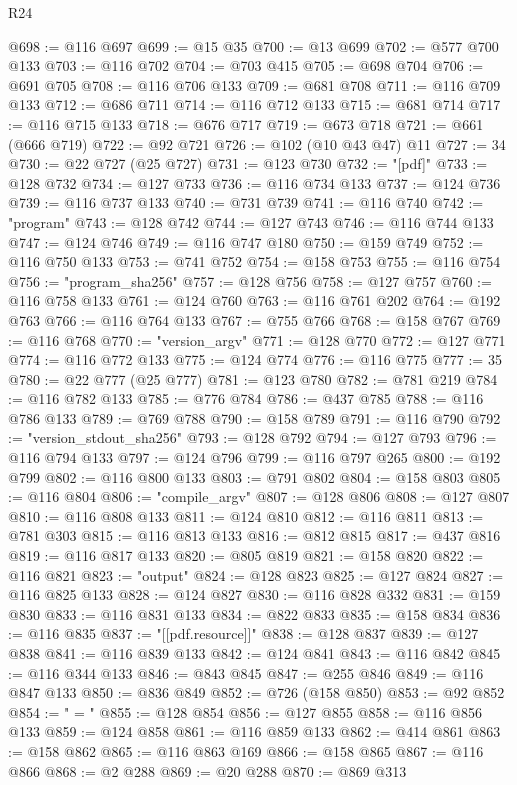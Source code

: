 \begin{lexlean}{R24}
\begin{coremodule}
@698 := @116 @697
@699 := @15 @35
@700 := @13 @699
@702 := @577 @700 @133
@703 := @116 @702
@704 := @703 @415
@705 := @698 @704
@706 := @691 @705
@708 := @116 @706 @133
@709 := @681 @708
@711 := @116 @709 @133
@712 := @686 @711
@714 := @116 @712 @133
@715 := @681 @714
@717 := @116 @715 @133
@718 := @676 @717
@719 := @673 @718
@721 := @661 (@666 @719)
@722 := @92 @721
@726 := @102 (@10 @43 @47) @11
@727 := 34
@730 := @22 @727 (@25 @727)
@731 := @123 @730
@732 := "[pdf]"
@733 := @128 @732
@734 := @127 @733
@736 := @116 @734 @133
@737 := @124 @736
@739 := @116 @737 @133
@740 := @731 @739
@741 := @116 @740
@742 := "program"
@743 := @128 @742
@744 := @127 @743
@746 := @116 @744 @133
@747 := @124 @746
@749 := @116 @747 @180
@750 := @159 @749
@752 := @116 @750 @133
@753 := @741 @752
@754 := @158 @753
@755 := @116 @754
@756 := "program_sha256"
@757 := @128 @756
@758 := @127 @757
@760 := @116 @758 @133
@761 := @124 @760
@763 := @116 @761 @202
@764 := @192 @763
@766 := @116 @764 @133
@767 := @755 @766
@768 := @158 @767
@769 := @116 @768
@770 := "version_argv"
@771 := @128 @770
@772 := @127 @771
@774 := @116 @772 @133
@775 := @124 @774
@776 := @116 @775
@777 := 35
@780 := @22 @777 (@25 @777)
@781 := @123 @780
@782 := @781 @219
@784 := @116 @782 @133
@785 := @776 @784
@786 := @437 @785
@788 := @116 @786 @133
@789 := @769 @788
@790 := @158 @789
@791 := @116 @790
@792 := "version_stdout_sha256"
@793 := @128 @792
@794 := @127 @793
@796 := @116 @794 @133
@797 := @124 @796
@799 := @116 @797 @265
@800 := @192 @799
@802 := @116 @800 @133
@803 := @791 @802
@804 := @158 @803
@805 := @116 @804
@806 := "compile_argv"
@807 := @128 @806
@808 := @127 @807
@810 := @116 @808 @133
@811 := @124 @810
@812 := @116 @811
@813 := @781 @303
@815 := @116 @813 @133
@816 := @812 @815
@817 := @437 @816
@819 := @116 @817 @133
@820 := @805 @819
@821 := @158 @820
@822 := @116 @821
@823 := "output"
@824 := @128 @823
@825 := @127 @824
@827 := @116 @825 @133
@828 := @124 @827
@830 := @116 @828 @332
@831 := @159 @830
@833 := @116 @831 @133
@834 := @822 @833
@835 := @158 @834
@836 := @116 @835
@837 := "[[pdf.resource]]"
@838 := @128 @837
@839 := @127 @838
@841 := @116 @839 @133
@842 := @124 @841
@843 := @116 @842
@845 := @116 @344 @133
@846 := @843 @845
@847 := @255 @846
@849 := @116 @847 @133
@850 := @836 @849
@852 := @726 (@158 @850)
@853 := @92 @852
@854 := " = "
@855 := @128 @854
@856 := @127 @855
@858 := @116 @856 @133
@859 := @124 @858
@861 := @116 @859 @133
@862 := @414 @861
@863 := @158 @862
@865 := @116 @863 @169
@866 := @158 @865
@867 := @116 @866
@868 := @2 @288
@869 := @20 @288
@870 := @869 @313

\end{coremodule}
\end{lexlean}
